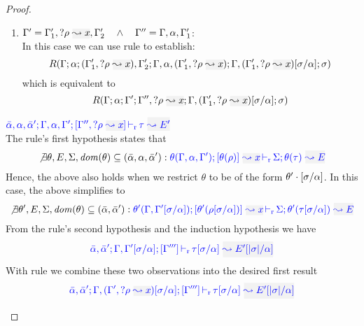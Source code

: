 \begin{proof}
\begin{description}
\begin{enumerate}
  \item $\tenv' = \tenv_1',\envi{\rulet}{x}, \tenv_2' \andl \tenv'' = \tenv,\alpha,\tenv_1'$: \\
  In this case we can use rule  to establish:
\begin{equation*}
  R(\tenv;\alpha;(\tenv_1',\envi{\rulet}{x}),\tenv_2';\tenv,\alpha,(\tenv_1',\envi{\rulet}{x});
  \tenv,(\tenv_1',\envi{\rulet}{x})[\suty/\alpha];\sigma)
\end{equation*}
  which is equivalent to
\begin{equation*}
  R(\tenv;\alpha;\tenv';\tenv'',\envi{\rulet}{x};\tenv,(\tenv_1',\envi{\rulet}{x})[\suty/\alpha];\sigma)
\end{equation*}
  \end{enumerate}

\item[\fbox{\rref{L-RuleNoMatch}}]\quad$\dlres{\bar{\alpha},\alpha,\bar{\alpha}'}{\tenv,\alpha,\tenv'}{\tenv'',\envi{\rulet}{x}}{\type}{E'}$\ \\

The rule's first hypothesis states that
\begin{equation*}
  \not\exists \theta, E, \Sigma, \mathit{dom}(\theta) \subseteq (\bar{\alpha},\alpha,\bar{\alpha}'):
  \dmres{\theta(\tenv,\alpha,\tenv')}{\theta(\rulet)}{x}{\theta(\type)}{E}{\Sigma}
\end{equation*}
  Hence, the above also holds when we restrict $\theta$ to be of the form
$\theta' \cdot [\sigma/\alpha]$. In this case, the above simplifies to
\begin{equation*}
  \not\exists \theta', E, \Sigma, \mathit{dom}(\theta) \subseteq (\bar{\alpha},\bar{\alpha}'):
  \dmres{\theta'(\tenv,\tenv'[\suty/\alpha])}{\theta'(\rulet[\suty/\alpha])}{x}{\theta'(\type[\suty/\alpha])}{E}{\Sigma}
\end{equation*}
  From the rule's second hypothesis and the induction hypothesis we have
\begin{equation*}
  \dlres{\bar{\alpha},\bar{\alpha}'}{\tenv,\tenv'[\suty/\alpha]}{\tenv'''}{\type[\suty/\alpha]}{E'[|\suty|/\alpha]}
\end{equation*}
  With rule  we combine these two observations into the desired first result
\begin{equation*}
  \dlres{\bar{\alpha},\bar{\alpha}'}{\tenv,(\tenv',\envi{\rulet}{x})[\suty/\alpha]}{\tenv'''}{\type[\suty/\alpha]}{E'[|\suty|/\alpha]}
\end{equation*}


\end{description}
\end{proof}
